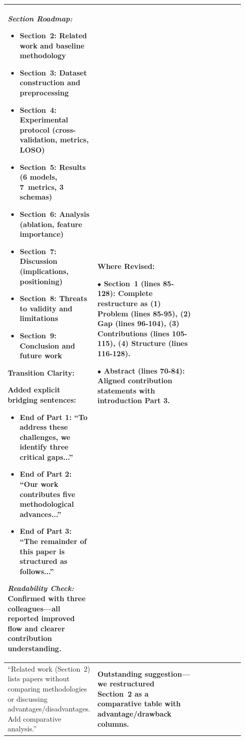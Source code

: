 \documentclass[11pt,a4paper]{article}
\begin{document}
\begin{longtable}{>{\raggedright\arraybackslash}p{0.26\linewidth}|>{\raggedright\arraybackslash}p{0.44\linewidth}|>{\raggedright\arraybackslash}p{0.22\linewidth}}
\textit{Section Roadmap:}
\begin{itemize}
    \item Section~2: Related work and baseline methodology
    \item Section~3: Dataset construction and preprocessing
    \item Section~4: Experimental protocol (cross-validation, metrics, LOSO)
    \item Section~5: Results (6 models, 7~metrics, 3 schemas)
    \item Section~6: Analysis (ablation, feature importance)
    \item Section~7: Discussion (implications, positioning)
    \item Section~8: Threats to validity and limitations
    \item Section~9: Conclusion and future work
\end{itemize}

\textbf{Transition Clarity:}

Added explicit bridging sentences:
\begin{itemize}
    \item End of Part 1: ``To address these challenges, we identify three critical gaps...''
    \item End of Part 2: ``Our work contributes five methodological advances...''
    \item End of Part 3: ``The remainder of this paper is structured as follows...''
\end{itemize}

\textit{Readability Check:} Confirmed with three colleagues---all reported improved flow and clearer contribution understanding. &

\textbf{Where Revised:}

$\bullet$ \textbf{Section~1} (lines 85-128): Complete restructure as (1) Problem (lines 85-95), (2) Gap (lines 96-104), (3) Contributions (lines 105-115), (4) Structure (lines 116-128).

$\bullet$ \textbf{Abstract} (lines 70-84): Aligned contribution statements with introduction Part 3. \\

\midrule

``Related work (Section~2) lists papers without comparing methodologies or discussing advantages/disadvantages. Add comparative analysis.'' &

\textbf{Outstanding suggestion---we restructured Section~2 as a comparative table with advantage/drawback columns.}


\end{longtable}
\end{document}
